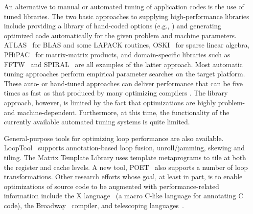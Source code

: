 An alternative to manual or automated tuning of application codes is the use
of tuned libraries. The two basic approaches to supplying high-performance
libraries include providing a library of hand-coded options (e.g.,
\cite{BLAS,ESSL,Goto:2006fk}) and generating optimized code automatically
for the given problem and machine parameters. 
ATLAS~\cite{atlas_sc98}
for BLAS and some LAPACK
routines, OSKI~\cite{OSKI} for sparse linear algebra,
PHiPAC~\cite{bilmes97optimizing} for matrix-matrix products, and
domain-specific libraries such as FFTW~\cite{frigo98} and
SPIRAL~\cite{SPIRAL} are all examples of the latter approach. Most 
automatic tuning approaches perform empirical
parameter searches on the target platform.  
These auto- or hand-tuned
approaches can deliver performance that can be five times as fast as that
produced by many optimizing compilers \cite{WN147}.  The library approach,
however, is limited by the fact that optimizations are highly problem- and
machine-dependent. Furthermore, at this time, the functionality of the
currently available automated tuning systems is quite limited.

General-purpose tools for optimizing loop performance are also available.
LoopTool~\cite{LoopTool} supports annotation-based loop fusion,
unroll/jamming, skewing and tiling.  The Matrix Template Library
\cite{Siek:1998ys} uses template metaprograms to tile at both the register
and cache levels.  A new tool, POET~\cite{POET} also supports a number of
loop transformations. 
Other research efforts whose goal, at least in part, is to enable
optimizations of source code to be augmented with performance-related
information include the X language~\cite{XLanguage} (a macro C-like language
for annotating C code), the Broadway~\cite{broadway} compiler, and
telescoping languages~\cite{telescopingurl}.

